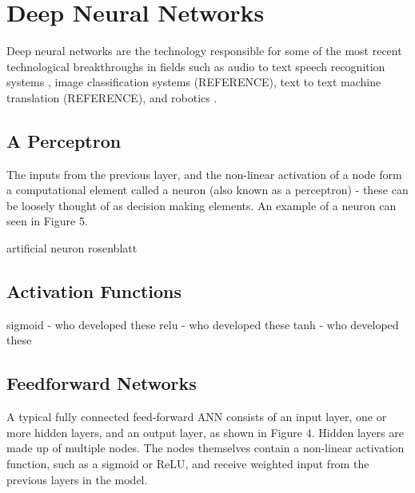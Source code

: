\section{Deep Neural Networks}\label{dnn}
Deep neural networks are the technology responsible for some of the most recent technological breakthroughs in fields such as audio to text speech recognition systems \cite{Hinton2012}, image classification systems (REFERENCE), text to text machine translation (REFERENCE), and robotics \cite{Mnih2015, Lillicrap2015, Schulman2015, Schulman2015highdimensional}.


\subsection{A Perceptron}
The inputs from the previous layer, and the non-linear activation of a node form a computational element called a neuron (also known as a perceptron) - these can be loosely thought of as decision making elements. An example of a neuron can seen in Figure 5.

artificial neuron rosenblatt


\subsection{Activation Functions}
sigmoid - who developed these
relu - who developed these
tanh - who developed these


\subsection{Feedforward Networks}
A typical fully connected feed-forward ANN consists of an input layer, one or more hidden layers, and an output layer, as shown in Figure 4. Hidden layers are made up of multiple nodes. The nodes themselves contain a non-linear activation function, such as a sigmoid or ReLU, and receive weighted input from the previous layers in the model.


